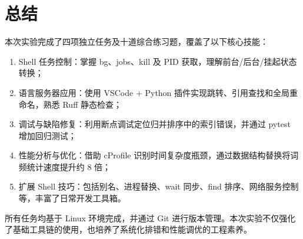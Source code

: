 \documentclass[12pt, a4paper]{article}
\numberwithin{equation}{section}
\begin{document}
\section*{总结}

\begin{conclusionbox}
本次实验完成了四项独立任务及十道综合练习题，覆盖了以下核心技能：
\begin{enumerate}
\item Shell 任务控制：掌握 bg、jobs、kill 及 PID 获取，理解前台/后台/挂起状态转换；
\item 语言服务器应用：使用 VSCode + Python 插件实现跳转、引用查找和全局重命名，熟悉 Ruff 静态检查；
\item 调试与缺陷修复：利用断点调试定位归并排序中的索引错误，并通过 pytest 增加回归测试；
\item 性能分析与优化：借助 cProfile 识别时间复杂度瓶颈，通过数据结构替换将词频统计速度提升约 8 倍；
\item 扩展 Shell 技巧：包括别名、进程替换、wait 同步、find 排序、网络服务控制等，丰富了日常开发工具箱。
\end{enumerate}
所有任务均基于 Linux 环境完成，并通过 Git 进行版本管理。本次实验不仅强化了基础工具链的使用，也培养了系统化排错和性能调优的工程素养。
\end{conclusionbox}
\end{document}
